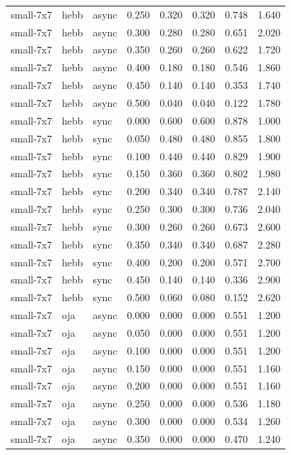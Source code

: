 \begin{tabular}{lllrrrrr}
small-7x7 & hebb & async & 0.250 & 0.320 & 0.320 & 0.748 & 1.640 \\
small-7x7 & hebb & async & 0.300 & 0.280 & 0.280 & 0.651 & 2.020 \\
small-7x7 & hebb & async & 0.350 & 0.260 & 0.260 & 0.622 & 1.720 \\
small-7x7 & hebb & async & 0.400 & 0.180 & 0.180 & 0.546 & 1.860 \\
small-7x7 & hebb & async & 0.450 & 0.140 & 0.140 & 0.353 & 1.740 \\
small-7x7 & hebb & async & 0.500 & 0.040 & 0.040 & 0.122 & 1.780 \\
small-7x7 & hebb & sync & 0.000 & 0.600 & 0.600 & 0.878 & 1.000 \\
small-7x7 & hebb & sync & 0.050 & 0.480 & 0.480 & 0.855 & 1.800 \\
small-7x7 & hebb & sync & 0.100 & 0.440 & 0.440 & 0.829 & 1.900 \\
small-7x7 & hebb & sync & 0.150 & 0.360 & 0.360 & 0.802 & 1.980 \\
small-7x7 & hebb & sync & 0.200 & 0.340 & 0.340 & 0.787 & 2.140 \\
small-7x7 & hebb & sync & 0.250 & 0.300 & 0.300 & 0.736 & 2.040 \\
small-7x7 & hebb & sync & 0.300 & 0.260 & 0.260 & 0.673 & 2.600 \\
small-7x7 & hebb & sync & 0.350 & 0.340 & 0.340 & 0.687 & 2.280 \\
small-7x7 & hebb & sync & 0.400 & 0.200 & 0.200 & 0.571 & 2.700 \\
small-7x7 & hebb & sync & 0.450 & 0.140 & 0.140 & 0.336 & 2.900 \\
small-7x7 & hebb & sync & 0.500 & 0.060 & 0.080 & 0.152 & 2.620 \\
small-7x7 & oja & async & 0.000 & 0.000 & 0.000 & 0.551 & 1.200 \\
small-7x7 & oja & async & 0.050 & 0.000 & 0.000 & 0.551 & 1.200 \\
small-7x7 & oja & async & 0.100 & 0.000 & 0.000 & 0.551 & 1.200 \\
small-7x7 & oja & async & 0.150 & 0.000 & 0.000 & 0.551 & 1.160 \\
small-7x7 & oja & async & 0.200 & 0.000 & 0.000 & 0.551 & 1.160 \\
small-7x7 & oja & async & 0.250 & 0.000 & 0.000 & 0.536 & 1.180 \\
small-7x7 & oja & async & 0.300 & 0.000 & 0.000 & 0.534 & 1.260 \\
small-7x7 & oja & async & 0.350 & 0.000 & 0.000 & 0.470 & 1.240 \\

\end{tabular}
